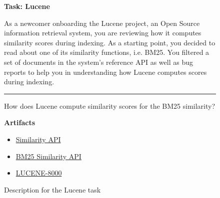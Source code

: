 \begin{figure}
\begin{mdframed}[backgroundcolor=gray!04] 
\begin{scriptsize}

{\large \textbf{Task: Lucene}} \bigskip

As a newcomer onboarding the Lucene project, an Open Source information retrieval system,
you are reviewing how it computes similarity scores during indexing. As a starting point, you
decided to read about one of its similarity functions, i.e. BM25. You filtered a set of documents
in the system's reference API as well as bug reports to help you in understanding how Lucene
computes scores during indexing.

\begin{center}
\rule{10cm}{0.4pt}
\end{center}

How does Lucene compute similarity scores for the BM25 similarity?

\medskip

\textbf{Artifacts}

\begin{itemize}
    \item \href{https://lucene.apache.org/core/7_1_0/core/org/apache/lucene/search/similarities/Similarity.html}{Similarity API}
    \item \href{https://lucene.apache.org/core/7_1_0/core/org/apache/lucene/search/similarities/BM25Similarity.html}{BM25 Similarity API}
    \item \href{https://issues.apache.org/jira/si/jira.issueviews:issue-html/LUCENE-8000/LUCENE-8000.html}{LUCENE-8000}
\end{itemize}

\end{scriptsize}
\end{mdframed}
\caption{Description for the Lucene task}
\end{figure}

    
